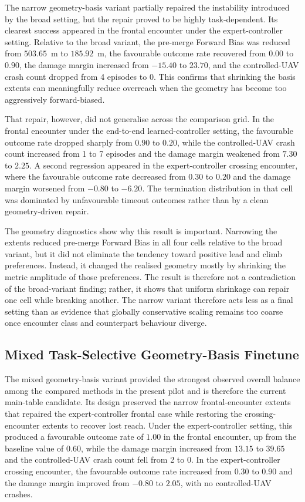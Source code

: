 \documentclass[drones,article,submit,pdftex,moreauthors]{Definitions/mdpi}
\begin{document}
The narrow geometry-basis variant partially repaired the instability introduced by the broad setting, but the repair proved to be highly task-dependent. Its clearest success appeared in the frontal encounter under the expert-controller setting. Relative to the broad variant, the pre-merge Forward Bias was reduced from $503.65$~m to $185.92$~m, the favourable outcome rate recovered from $0.00$ to $0.90$, the damage margin increased from $-15.40$ to $23.70$, and the controlled-UAV crash count dropped from 4 episodes to 0. This confirms that shrinking the basis extents can meaningfully reduce overreach when the geometry has become too aggressively forward-biased.

That repair, however, did not generalise across the comparison grid. In the frontal encounter under the end-to-end learned-controller setting, the favourable outcome rate dropped sharply from $0.90$ to $0.20$, while the controlled-UAV crash count increased from 1 to 7 episodes and the damage margin weakened from $7.30$ to $2.25$. A second regression appeared in the expert-controller crossing encounter, where the favourable outcome rate decreased from $0.30$ to $0.20$ and the damage margin worsened from $-0.80$ to $-6.20$. The termination distribution in that cell was dominated by unfavourable timeout outcomes rather than by a clean geometry-driven repair.

The geometry diagnostics show why this result is important. Narrowing the extents reduced pre-merge Forward Bias in all four cells relative to the broad variant, but it did not eliminate the tendency toward positive lead and climb preferences. Instead, it changed the realised geometry mostly by shrinking the metric amplitude of those preferences. The result is therefore not a contradiction of the broad-variant finding; rather, it shows that uniform shrinkage can repair one cell while breaking another. The narrow variant therefore acts less as a final setting than as evidence that globally conservative scaling remains too coarse once encounter class and counterpart behaviour diverge.

\subsection{Mixed Task-Selective Geometry-Basis Finetune}

The mixed geometry-basis variant provided the strongest observed overall balance among the compared methods in the present pilot and is therefore the current main-table candidate. Its design preserved the narrow frontal-encounter extents that repaired the expert-controller frontal case while restoring the crossing-encounter extents to recover lost reach. Under the expert-controller setting, this produced a favourable outcome rate of $1.00$ in the frontal encounter, up from the baseline value of $0.60$, while the damage margin increased from $13.15$ to $39.65$ and the controlled-UAV crash count fell from 2 to 0. In the expert-controller crossing encounter, the favourable outcome rate increased from $0.30$ to $0.90$ and the damage margin improved from $-0.80$ to $2.05$, with no controlled-UAV crashes.
\end{document}
